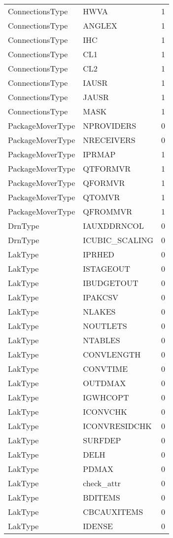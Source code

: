 \begin{longtable}{p{6cm} p{4cm} p{2cm} }
ConnectionsType &  HWVA & 1 \\ 
ConnectionsType &  ANGLEX & 1 \\ 
ConnectionsType &  IHC & 1 \\ 
ConnectionsType &  CL1 & 1 \\ 
ConnectionsType &  CL2 & 1 \\ 
ConnectionsType &  IAUSR & 1 \\ 
ConnectionsType &  JAUSR & 1 \\ 
ConnectionsType &  MASK & 1 \\ 
PackageMoverType &  NPROVIDERS & 0 \\ 
PackageMoverType &  NRECEIVERS & 0 \\ 
PackageMoverType &  IPRMAP & 1 \\ 
PackageMoverType &  QTFORMVR & 1 \\ 
PackageMoverType &  QFORMVR & 1 \\ 
PackageMoverType &  QTOMVR & 1 \\ 
PackageMoverType &  QFROMMVR & 1 \\ 
DrnType &  IAUXDDRNCOL & 0 \\ 
DrnType &  ICUBIC\_SCALING & 0 \\ 
LakType &  IPRHED & 0 \\ 
LakType &  ISTAGEOUT & 0 \\ 
LakType &  IBUDGETOUT & 0 \\ 
LakType &  IPAKCSV & 0 \\ 
LakType &  NLAKES & 0 \\ 
LakType &  NOUTLETS & 0 \\ 
LakType &  NTABLES & 0 \\ 
LakType &  CONVLENGTH & 0 \\ 
LakType &  CONVTIME & 0 \\ 
LakType &  OUTDMAX & 0 \\ 
LakType &  IGWHCOPT & 0 \\ 
LakType &  ICONVCHK & 0 \\ 
LakType &  ICONVRESIDCHK & 0 \\ 
LakType &  SURFDEP & 0 \\ 
LakType &  DELH & 0 \\ 
LakType &  PDMAX & 0 \\ 
LakType &  check\_attr & 0 \\ 
LakType &  BDITEMS & 0 \\ 
LakType &  CBCAUXITEMS & 0 \\ 
LakType &  IDENSE & 0 \\ 

\end{longtable}
